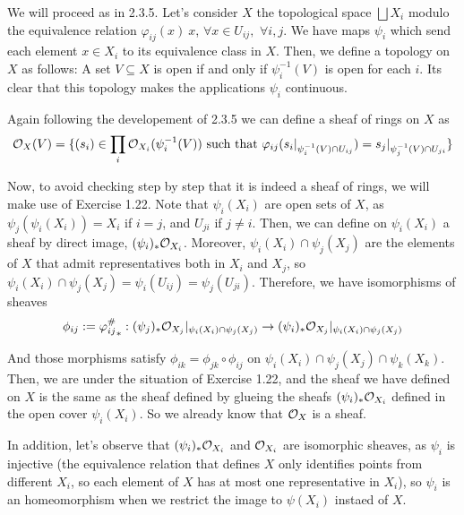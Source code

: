 \begin{sol}
	We will proceed as in 2.3.5. Let's consider $X$ the topological space $\bigsqcup X_i$ modulo the equivalence relation $\varphi_{ij}(x) ~ x$, $\forall x \in U_{ij}, \, \, \forall i,j$. We have maps $\psi_i$ which send each element $x \in X_i$ to its equivalence class in $X$. Then, we define a topology on $X$ as follows: A set $V \subseteq X$ is open if and only if $\psi_i^{-1}(V)$ is open for each $i$. Its clear that this topology makes the applications $\psi_i$ continuous.


	Again following the developement of 2.3.5 we can define a sheaf of rings on $X$ as 
	\[
		\mathcal{O}_X(V) = \{(s_i) \in \prod_i \mathcal{O}_{X_i}(\psi_i^{-1}(V)) \text{ such that } \varphi_{ij}(s_i|_{\psi_i^{-1}(V) \cap U_{ij}}) = s_j|_{\psi_j^{-1}(V) \cap U_{ji}} \}
	\]
 
	Now, to avoid checking step by step that it is indeed a sheaf of rings, we will make use of Exercise 1.22. Note that $\psi_i(X_i)$ are open sets of $X$, as $\psi_j(\psi_i(X_i)) = X_i$ if $i = j$, and $U_{ji}$ if $j \neq i$. Then, we can define on $\psi_i(X_i)$ a sheaf by direct image, $(\psi_i)_* \mathcal{O}_{X_i}$. Moreover, $\psi_i(X_i) \cap \psi_j(X_j)$ are the elements of $X$ that admit representatives both in $X_i$ and $X_j$, so $\psi_i(X_i) \cap \psi_j(X_j) = \psi_i(U_{ij}) = \psi_j(U_{ji})$. Therefore, we have isomorphisms of sheaves 
	\[
		\phi_{ij} := {\varphi_{ij}^{\#}}_* : (\psi_j)_* \mathcal{O}_{X_j}|_{\psi_i(X_i) \cap \psi_j(X_j)} \to (\psi_i)_* \mathcal{O}_{X_j}|_{\psi_i(X_i) \cap \psi_j(X_j)}
	\]

	And those morphisms satisfy $\phi_{ik} = \phi_{jk} \circ \phi_{ij}$ on $\psi_i(X_i) \cap \psi_j(X_j) \cap \psi_k(X_k)$. Then, we are under the situation of Exercise 1.22, and the sheaf we have defined on $X$ is the same as the sheaf defined by glueing the sheafs $(\psi_i)_* \mathcal{O}_{X_i}$ defined in the open cover $\psi_i(X_i)$. So we already know that $\mathcal{O}_X$ is a sheaf. 

	In addition, let's observe that $(\psi_i)_* \mathcal{O}_{X_i}$ and $\mathcal{O}_{X_i}$ are isomorphic sheaves, as $\psi_i$ is injective (the equivalence relation that defines $X$ only identifies points from different $X_i$, so each element of $X$ has at most one representative in $X_i$), so $\psi_i$ is an homeomorphism when we restrict the image to $\psi(X_i)$ instaed of $X$.


\end{sol}
